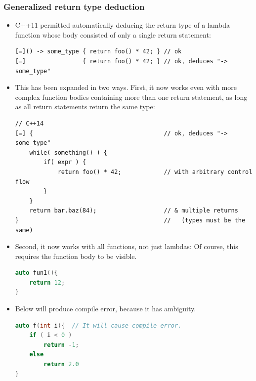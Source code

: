 \documentclass[a4paper,12pt,twoside]{book}
\begin{document}
\subsubsection{Generalized return type deduction}
\begin{itemize}
	\item C++11 permitted automatically deducing the return type of a lambda function whose body consisted of only a single return statement:
\begin{lstlisting}
[=]() -> some_type { return foo() * 42; } // ok
[=]                { return foo() * 42; } // ok, deduces "-> some_type"
\end{lstlisting}
\item This has been expanded in two ways. First, it now works even with more complex function bodies containing more than one return statement, as long as all return statements return the same type:
\begin{lstlisting}
// C++14
[=] {                                     // ok, deduces "-> some_type"
	while( something() ) {
		if( expr ) {
			return foo() * 42;            // with arbitrary control flow
		}
	}
	return bar.baz(84);                   // & multiple returns
}                                         //   (types must be the same)
\end{lstlisting}
\item Second, it now works with all functions, not just lambdas: Of course, this requires the function body to be visible.
\begin{lstlisting}[frame=single, language=c++]
auto fun1(){
	return 12;
}
\end{lstlisting}

	\item Below will produce compile error, because it has ambiguity.
\begin{lstlisting}[frame=single, language=c++]
auto f(int i){  // It will cause compile error.
	if ( i < 0 )
		return -1;
	else
		return 2.0
}
\end{lstlisting}

\end{itemize}
\end{document}
